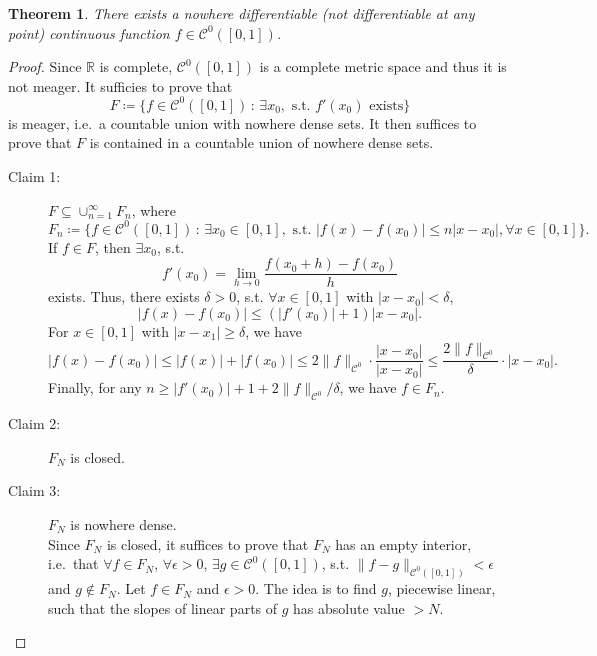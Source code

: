 \documentclass[12pt]{article}
\theoremstyle{plain}
\newtheorem{thm}{Theorem}
\theoremstyle{definition}
\begin{document}
\begin{thm}
    There exists a nowhere differentiable (not differentiable at any point)
    continuous function $f\in\mathcal{C}^0([0,1])$.
\end{thm}
\begin{proof}
    Since $\mathbb{R}$ is complete, $\mathcal{C}^0([0,1])$ is a complete metric
    space and thus it is not meager.
    It sufficies to prove that
    $$F\coloneqq\{f\in\mathcal{C}^0([0,1])\,:\,\exists x_0,\text{ s.t.
    }f'(x_0)\text{ exists}\}$$
    is meager, i.e.\ a countable union with nowhere dense sets.
    It then suffices to prove that $F$ is contained in a countable union of
    nowhere dense sets.
    \begin{description}
        \item[Claim 1:]
            $F\subseteq\cup_{n=1}^\infty F_n$, where
            $$F_n\coloneqq\{f\in\mathcal{C}^0([0,1])\,:\,\exists
            x_0\in[0,1],\text{ s.t. }|f(x)-f(x_0)|\leq n|x-x_0|,\forall
            x\in[0,1]\}.$$
            If $f\in F$, then $\exists x_0$, s.t. 
            $$f'(x_0)=\lim_{h\rightarrow 0}\frac{f(x_0+h)-f(x_0)}{h}$$
            exists.
            Thus, there exists $\delta>0$, s.t. $\forall x\in[0,1]$ with
            $|x-x_0|<\delta$,
            $$|f(x)-f(x_0)|\leq(|f'(x_0)|+1)|x-x_0|.$$
            For $x\in[0,1]$ with $|x-x_1|\geq\delta$, we have
            $$|f(x)-f(x_0)|\leq |f(x)|+|f(x_0)|\leq
            2\|f\|_{\mathcal{C}^0}\cdot\frac{|x-x_0|}{|x-x_0|}
            \leq\frac{2\|f\|_{\mathcal{C}^0}}{\delta}\cdot|x-x_0|.$$
            Finally, for any $n\geq |f'(x_0)|+1+2\|f\|_{\mathcal{C}^0}/\delta$,
            we have $f\in F_n$.
        \item[Claim 2:]
            $F_N$ is closed.\\
        \item[Claim 3:]
            $F_N$ is nowhere dense.\\
            Since $F_N$ is closed, it suffices to prove that $F_N$ has an empty
            interior, i.e.\ that $\forall f\in F_N$, $\forall \epsilon>0$,
            $\exists g\in \mathcal{C}^0([0,1])$, s.t.
            $\|f-g\|_{\mathcal{C}^0([0,1])}<\epsilon$ and $g\notin F_N$.
            Let $f\in F_N$ and $\epsilon>0$.
            The idea is to find $g$, piecewise linear, such that the slopes of
            linear parts of $g$ has absolute value $>N$.


\end{description}
\end{proof}
\end{document}
